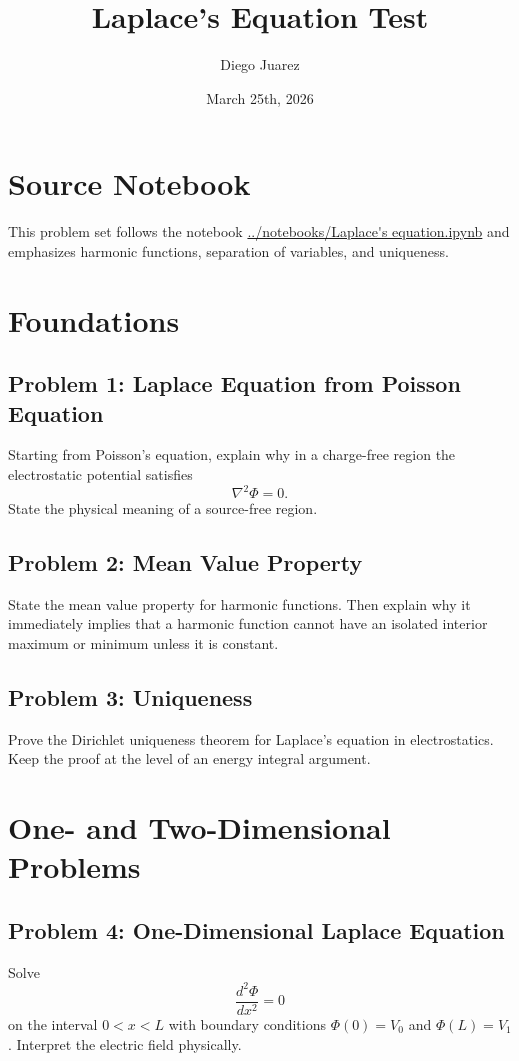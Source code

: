 \documentclass[hidelinks]{article}
\title{\textbf{Laplace's Equation Test}}
\author{Diego Juarez}
\date{March 25th, 2026}
\begin{document}
\hypersetup{bookmarksnumbered=true}
\pagecolor{black}
\color{white}
\maketitle

\begin{Large}
\tableofcontents
\end{Large}
\pagebreak

\section{Source Notebook}
This problem set follows the notebook
\url{../notebooks/Laplace's equation.ipynb}
and emphasizes harmonic functions, separation of variables, and uniqueness.

\section{Foundations}
\subsection{Problem 1: Laplace Equation from Poisson Equation}
Starting from Poisson's equation, explain why in a charge-free region the electrostatic potential satisfies
\[
\nabla^2\Phi=0.
\]
State the physical meaning of a source-free region.

\subsection{Problem 2: Mean Value Property}
State the mean value property for harmonic functions. Then explain why it immediately implies that a harmonic function cannot have an isolated interior maximum or minimum unless it is constant.

\subsection{Problem 3: Uniqueness}
Prove the Dirichlet uniqueness theorem for Laplace's equation in electrostatics. Keep the proof at the level of an energy integral argument.

\section{One- and Two-Dimensional Problems}
\subsection{Problem 4: One-Dimensional Laplace Equation}
Solve
\[
\frac{d^2\Phi}{dx^2}=0
\]
on the interval $0<x<L$ with boundary conditions $\Phi(0)=V_0$ and $\Phi(L)=V_1$. Interpret the electric field physically.
\end{document}
